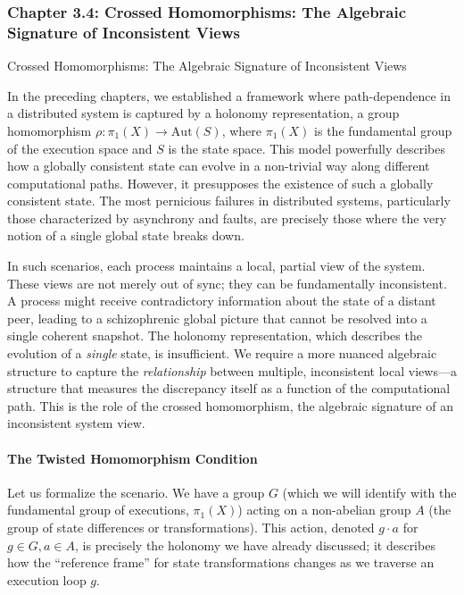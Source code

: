 \documentclass[
]{article}
\begin{document}
\subsubsection{Chapter 3.4: Crossed Homomorphisms: The Algebraic
Signature of Inconsistent
Views}\label{chapter-3.4-crossed-homomorphisms-the-algebraic-signature-of-inconsistent-views}

\protect{}\label{chapter-3-4-Crossed_Homomorphisms__The_Algebraic_Sig}{}

Crossed Homomorphisms: The Algebraic Signature of Inconsistent Views

In the preceding chapters, we established a framework where
path-dependence in a distributed system is captured by a holonomy
representation, a group homomorphism
\(\rho: \pi_1(X) \to \text{Aut}(S)\), where \(\pi_1(X)\) is the
fundamental group of the execution space and \(S\) is the state space.
This model powerfully describes how a globally consistent state can
evolve in a non-trivial way along different computational paths.
However, it presupposes the existence of such a globally consistent
state. The most pernicious failures in distributed systems, particularly
those characterized by asynchrony and faults, are precisely those where
the very notion of a single global state breaks down.

In such scenarios, each process maintains a local, partial view of the
system. These views are not merely out of sync; they can be
fundamentally inconsistent. A process might receive contradictory
information about the state of a distant peer, leading to a
schizophrenic global picture that cannot be resolved into a single
coherent snapshot. The holonomy representation, which describes the
evolution of a \emph{single} state, is insufficient. We require a more
nuanced algebraic structure to capture the \emph{relationship} between
multiple, inconsistent local views---a structure that measures the
discrepancy itself as a function of the computational path. This is the
role of the crossed homomorphism, the algebraic signature of an
inconsistent system view.

\paragraph{The Twisted Homomorphism
Condition}\label{the-twisted-homomorphism-condition}

Let us formalize the scenario. We have a group \(G\) (which we will
identify with the fundamental group of executions, \(\pi_1(X)\)) acting
on a non-abelian group \(A\) (the group of state differences or
transformations). This action, denoted \(g \cdot a\) for
\(g \in G, a \in A\), is precisely the holonomy we have already
discussed; it describes how the ``reference frame'' for state
transformations changes as we traverse an execution loop \(g\).
\end{document}
